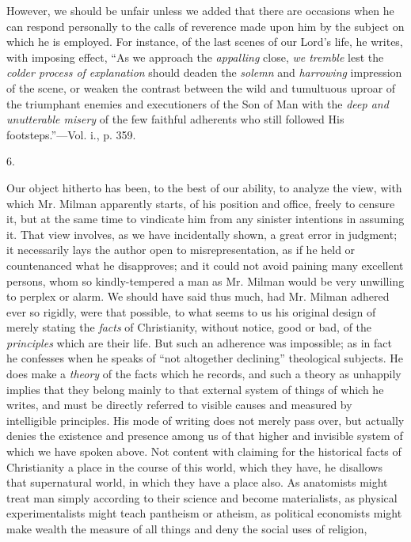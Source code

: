 However, we should be unfair unless we added that
there are occasions when he can respond personally to the calls of
reverence made upon him by the subject on which he is employed. For
instance, of the last scenes of our Lord's life, he writes, with
imposing effect, ``As we approach the \emph{appalling} close, \emph{we
tremble} lest the \emph{colder process of explanation} should
deaden the \emph{solemn} and \emph{harrowing} impression of the scene,
or weaken the contrast between the wild and tumultuous uproar of the
triumphant enemies and executioners of the Son of Man with the \emph{deep
and unutterable misery} of the few faithful adherents who still
followed His footsteps.''—Vol. i., p. 359.

6.

Our object hitherto has been, to the best of our
ability, to analyze the view, with which Mr. Milman apparently starts,
of his position and office, freely to censure it, but at the same time
to vindicate him from any sinister intentions in assuming it. That
view involves, as we have incidentally shown, a great error in
judgment; it necessarily lays the author open to misrepresentation, as
if he held or countenanced what he disapproves; and it could not avoid
paining many excellent persons, whom so kindly-tempered a man as Mr.
Milman would be very unwilling to perplex or alarm. We should have
said thus much, had Mr. Milman adhered ever so rigidly, were that
possible, to what seems to us his original design of merely stating
the \emph{facts} of Christianity, without notice, good or bad, of the \emph{principles}
which are their life. But such an adherence was impossible; as in fact
he confesses when he speaks of ``not altogether declining'' theological
subjects. He does make a \emph{theory} of the facts which he records,
and such a theory as unhappily implies that they belong mainly to that
external system of things of which he writes, and must be directly
referred to visible causes and measured by intelligible principles.
His mode of writing does not merely pass over, but actually denies the
existence and presence among us of that higher and invisible system of
which we have spoken above. Not content with claiming for the
historical facts of Christianity a place in the course of this world,
which they have, he disallows that supernatural world, in which they
have a place also. As anatomists might treat man simply according to
their science and become materialists, as physical experimentalists
might teach pantheism or atheism, as political economists might make
wealth the measure of all things and deny the social uses of religion,

